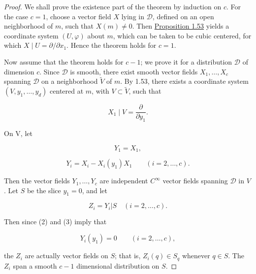 \begin{proof}
	We shall prove the existence part of the theorem by induction on $c$. For the case $c=1$, choose a vector field $X$ lying in $\mathcal{D}$, defined on an open neighborhood of $m$, such that $X(m)\neq0$. Then \hyperref[thm:1.53]{Proposition 1.53} yields a coordinate system $(U,\varphi)$ about $m$, which can be taken to be cubic centered, for which $X\mid U=\partial/\partial x_1$. Hence the theorem holds for $c=1$.

	Now assume that the theorem holds for $c-1$; we prove it for a distribution $\mathcal{D}$ of dimension $c$. Since $\mathcal{D}$ is smooth, there exist smooth vector fields $X_1,\ldots,X_c$ spanning $\mathcal{D}$ on a neighborhood $\tilde{V}$ of $m$. By 1.53, there exists a coordinate system $(V,y_1,\ldots,y_d)$ centered at $m$, with $V\subset\tilde{V}$, such that

	\begin{equation}
		\tag{2}\label{eq:1.60:2}
		X_{1}\mid V=\frac{\partial}{\partial y_{1}}.
	\end{equation}

	On V, let

	\[
		Y_{1}=X_{1},
	\]

	\begin{equation}
		\tag{3}\label{eq:1.60:3}
		Y_{i}=X_{i}-X_{i}(y_{1})X_{1}\qquad(i=2,\ldots,c).
	\end{equation}

	\begin{center}
	\end{center}

	Then the vector fields $Y_{1}, \ldots, Y_{c}$ are independent $C^{\infty}$ vector fields spanning $\mathcal{D}$ in $V$. Let $S$ be the slice $y_{1}=0$, and let

	\begin{equation}
		\tag{4}\label{eq:1.60:4}
		Z_{i}=Y_{i}\left|S\right.\quad(i=2,\ldots,c).
	\end{equation}

	Then since (2) and (3) imply that

	\begin{equation}
		\tag{5}\label{eq:1.60:5}
		Y_{i}(y_{1})=0\qquad(i=2,\ldots,c),
	\end{equation}

	the $Z_i$ are actually vector fields on $S$; that is, $Z_i(q) \in S_q$ whenever $q \in S$. The $Z_i$ span a smooth $c - 1$ dimensional distribution on $S$.


\end{proof}
